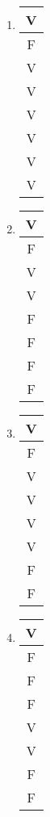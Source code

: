 \begin{enumerate}
  \begin{multicols}{5}
  \begin{enumerate}
  \item  
  \begin{table}[H]
 \begin{tabular}{|c|} \hline
 V   \\ \hline
 F  \\ \hline
 V   \\ \hline
 V   \\ \hline
 V   \\ \hline
 V   \\ \hline
 V  \\ \hline
 V   \\ \hline
 \end{tabular}
 \end{table}
 
  \item
  \begin{table}[H]
 \begin{tabular}{|c|} \hline
 V   \\ \hline
 F  \\ \hline
 V   \\ \hline
 V   \\ \hline
 F   \\ \hline
 F   \\ \hline
 F  \\ \hline
 F   \\ \hline
 \end{tabular}
 \end{table}
 
  \item
  \begin{table}[H]
 \begin{tabular}{|c|} \hline
 V   \\ \hline
 F  \\ \hline
 V   \\ \hline
 V   \\ \hline
 V   \\ \hline
 V   \\ \hline
 F  \\ \hline
 F   \\ \hline
 \end{tabular}
 \end{table}
 
  \item
  \begin{table}[H]
 \begin{tabular}{|c|} \hline
 V   \\ \hline
 F  \\ \hline
 F   \\ \hline
 F   \\ \hline
 V   \\ \hline
 V   \\ \hline
 F  \\ \hline
 F   \\ \hline
 \end{tabular}
 \end{table}
 

\end{enumerate}
\end{multicols}
\end{enumerate}
